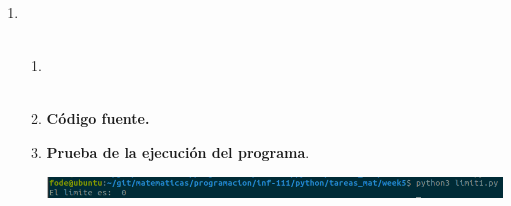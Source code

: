 \begin{enumerate}

\item \textbf{\large }\\\\

    \begin{enumerate}[\bfseries a)]

	\item \textbf{\large }\\\\

	\item \textbf{Código fuente.}\\ 
	    
	    
	    \vspace{.5cm}
	
	\item \textbf{Prueba de la ejecución del programa}.\\
	    \begin{center}
		\includegraphics[scale=.55]{imagenes/tareas_mat/week5/limit1.png}
	    \end{center}

    \end{enumerate}

\newpage

\end{enumerate}
